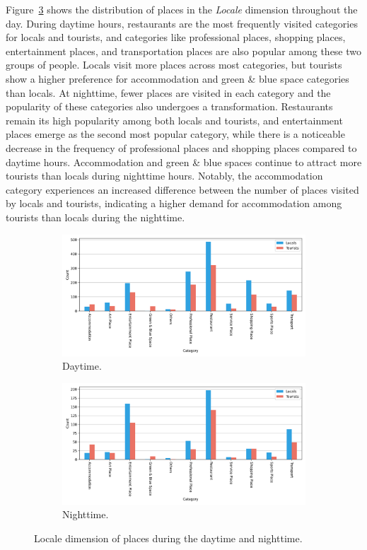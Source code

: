 \documentclass{article}
\theoremstyle{remark}
\begin{document}
Figure~\ref{fig:places_locale_day} shows the distribution of places in the \textit{Locale} dimension throughout the day. During daytime hours, restaurants are the most frequently visited categories for locals and tourists, and categories like professional places, shopping places, entertainment places, and transportation places are also popular among these two groups of people. Locals visit more places across most categories, but tourists show a higher preference for accommodation and green \& blue space categories than locals. At nighttime, fewer places are visited in each category and the popularity of these categories also undergoes a transformation. Restaurants remain its high popularity among both locals and tourists, and entertainment places emerge as the second most popular category, while there is a noticeable decrease in the frequency of professional places and shopping places compared to daytime hours. Accommodation and green \& blue spaces continue to attract more tourists than locals during nighttime hours. Notably, the accommodation category experiences an increased difference between the number of places visited by locals and tourists, indicating a higher demand for accommodation among tourists than locals during the nighttime.


\begin{figure}[!h]

\centering
\begin{subfigure}{0.6\textheight}
\centering
\includegraphics[width=0.9\linewidth]{figures/places_locale_daytime.png} 
\caption{Daytime.}
\label{fig:places_locale_daytime}
\end{subfigure}
\begin{subfigure}{0.6\textheight}
\centering
\includegraphics[width=0.9\linewidth]{figures/places_locale_nighttime.png}
\caption{Nighttime.}
\label{fig:places_locale_nighttime}
\end{subfigure}

\caption{Locale dimension of places during the daytime and nighttime.}
\label{fig:places_locale_day}
\end{figure}
\end{document}
